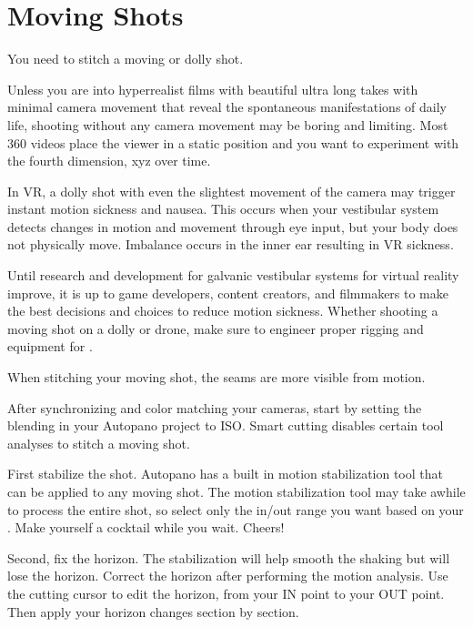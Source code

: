 \section{Moving Shots}
\pagecolor{white}
\label{chap:45}
\begin{fullwidth}

\problem

{\large You need to stitch a moving or dolly shot. \par}

Unless you are into hyperrealist films with beautiful ultra long takes with minimal camera movement that reveal the spontaneous manifestations of daily life, shooting without any camera movement may be boring and limiting. Most 360 videos place the viewer in a static position and you want to experiment with the fourth dimension, xyz over time.

In VR, a dolly shot with even the slightest movement of the camera may trigger instant motion sickness and nausea. This occurs when your vestibular system detects changes in motion and movement through eye input, but your body does not physically move. Imbalance occurs in the inner ear resulting in VR sickness. 

Until research and development for galvanic vestibular systems for virtual reality improve, it is up to game developers, content creators, and filmmakers to make the best decisions and choices to reduce motion sickness. Whether shooting a moving shot on a dolly or drone, make sure to engineer proper rigging and equipment for \textbf{}. 

When stitching your moving shot, the seams are more visible from motion.

\clearpage
\solution

After synchronizing and color matching your cameras, start by setting the blending in your Autopano project to ISO. Smart cutting disables certain tool analyses to stitch a moving shot. 


First stabilize the shot. Autopano has a built in motion stabilization tool that can be applied to any moving shot. The motion stabilization tool may take awhile to process the entire shot, so select only the in/out range you want based on your \textbf{}. Make yourself a cocktail while you wait. Cheers!

\clearpage
Second, fix the horizon. The stabilization will help smooth the shaking but will lose the horizon. Correct the horizon after performing the motion analysis. Use the cutting cursor to edit the horizon, from your IN point to your OUT point. Then apply your horizon changes section by section.


\end{fullwidth}
